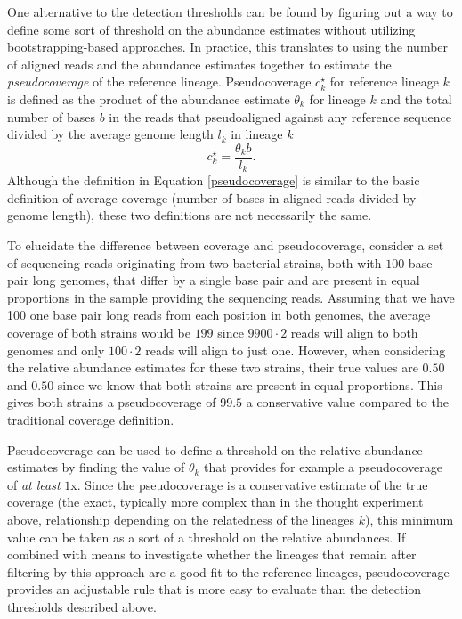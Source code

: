 \documentclass[officiallayout]{tktla}
\begin{document}
One alternative to the detection thresholds can be found by figuring
out a way to define some sort of threshold on the abundance estimates
without utilizing bootstrapping-based approaches. In practice, this
translates to using the number of aligned reads and the abundance
estimates together to estimate the \textit{pseudocoverage} of the
reference lineage. Pseudocoverage $c^{\star}_{k}$ for reference
lineage $k$ is defined as the product of the abundance estimate
$\theta_{k}$ for lineage $k$ and the total number of bases $b$ in the
reads that pseudoaligned against any reference sequence divided by the
average genome length $l_{k}$ in lineage $k$
\begin{equation}
  \label{pseudocoverage}
  c_{k}^{\star} = \frac{\theta_{k}b}{l_{k}}.
\end{equation}
Although the definition in Equation \ref{pseudocoverage} is similar to
the basic definition of average coverage (number of bases in aligned
reads divided by genome length), these two definitions are not
necessarily the same.

To elucidate the difference between coverage and pseudocoverage,
consider a set of sequencing reads originating from two bacterial
strains, both with $100$ base pair long genomes, that differ by a
single base pair and are present in equal proportions in the sample
providing the sequencing reads. Assuming that we have 100 one base
pair long reads from each position in both genomes, the average
coverage of both strains would be $199$ since $9900\cdot2$ reads
will align to both genomes and only $100\cdot2$ reads will align to
just one. However, when considering the relative abundance estimates
for these two strains, their true values are $0.50$ and $0.50$ since
we know that both strains are present in equal proportions. This gives
both strains a pseudocoverage of $99.5$ \textemdash a conservative
value compared to the traditional coverage definition.

Pseudocoverage can be used to define a threshold on the relative
abundance estimates by finding the value of $\theta_{k}$ that provides
for example a pseudocoverage of \textit{at least} $1$x. Since the
pseudocoverage is a conservative estimate of the true coverage (the
exact, typically more complex than in the thought experiment above,
relationship depending on the relatedness of the lineages $k$), this
minimum value can be taken as a sort of a threshold on the relative
abundances. If combined with means to investigate whether the lineages
that remain after filtering by this approach are a good fit to the
reference lineages, pseudocoverage provides an adjustable rule that is
more easy to evaluate than the detection thresholds described above.
\end{document}
